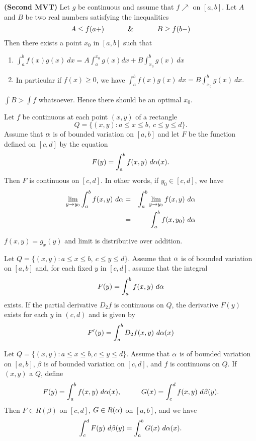 \documentclass[10pt,a4paper]{book}
\begin{document}
\begin{Thm}\textbf{(Second MVT)}
Let $g$ be continuous and assume that $f \nearrow$ on $[a, b]$. Let $A $ and $B$ be two real numbers satisfying the inequalities
$$A \leq f(a+) \hspace*{1cm} \And \hspace*{1cm} B \geq f(b-)$$
Then there exists a point $x_0$ in $[a, b]$ such that
\begin{enumerate}
     

    \item $\int_a^b f(x)g(x)\ dx = A\int_a^{x_0} g(x) dx + B\int_{x_0}^b g(x)\ dx$
    \item In particular if $f(x)\geq 0$, we have  $\int_a^b f(x)g(x)\ dx  = B\int_{x_0}^b g(x) \ dx.$
\end{enumerate}
\end{Thm}
\PP $\int B > \int f$ whatsoever. Hence there should be an optimal $x_0$.

\begin{Thm}
Let $f$ be continuous at each point $(x, y)$ of a rectangle
    $$Q = \{(x,y): a\leq x \leq b,\ c\leq y \leq d \}.$$
Assume that $\alpha$ is of bounded variation on $[a, b]$ and let $F$ be the function defined on $[c, d]$ by the equation 
$$F(y) = \int_a^b f(x,y)\ \da(x). $$
Then $F$ is continuous on $[c, d]$. In other words, if $y_0 \in [c, d]$, we have
\begin{eqnarray*}
\lim_{y \rightarrow y_0} \int_a^b f(x,y)\ d \alpha & = & \int_a^b \lim_{y \rightarrow y_0}f(x,y)\ d \alpha\\
& = & \int_a^b f(x,y_0)\ d \alpha
\end{eqnarray*}
\end{Thm}
\PP $f(x, y) = g_x(y)$ and limit is distributive over addition.

\begin{Thm}
Let $Q = \{(x, y) : a \leq x \leq b,\  c \leq y \leq d\}$. Assume that $\alpha$ is of bounded variation on $[a, b]$ and, for each fixed $y$ in $[c, d]$, assume that the integral
$$F(y) = \int_a^b f(x,y)\ d \alpha$$
exists. If the partial derivative $D_2f$ is continuous on $Q$, the derivative $F(y)$ exists for each $y$ in $(c, d)$ and is given by  
    $$F'(y) = \int_a^b D_2f(x,y) \ d \alpha(x)$$
\end{Thm}

\begin{Thm}
Let $Q = \{(x, y) : a \leq x \leq b, c \leq y \leq d\}$. Assume that $\alpha$ is of
bounded variation on $[a, b]$, $\beta$ is of bounded variation on $[c, d]$, and $f$ is continuous on $Q$. If $(x, y)$ a $Q$, define
$$F(y) = \int_a^b f(x,y)\ d \alpha(x), \hspace*{1cm} G(x) = \int_c^d f(x,y)\ d\beta(y).$$
Then $F \in R(\beta)$ on $[c, d]$, $G \in R(\alpha)$ on $[a, b]$, and we have
$$\int_c^d F(y) \ d\beta(y) = \int_a^b G(x) \ d \alpha(x).$$ 

\end{Thm}
\end{document}
